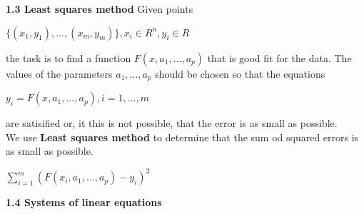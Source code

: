 \documentclass{article}
\begin{document}
\begin{multicols}{2}
	\textbf{1.3 Least squares method}
	Given points
	\begin{center}
		\begin{math}
			\{ (x_1, y_1), \dots, (x_m, y_m) \}, x_i \in R^n , y_i \in R
		\end{math}
	\end{center}
	the task is to find a function $F(x, a_1, \dots, a_p)$ that is good fit for the data.
	The values of the parameters $a_1, \dots, a_p$ should be chosen so that the equations
	\begin{center}
		\begin{math}
			y_i = F(x, a_1, \dots, a_p), i=1,\dots,m
		\end{math}
	\end{center} are satisified or, it this is not possible, that the error is as small as possible.\\
	We use \textbf{Least squares method} to determine that the sum od squared errors is as small as possible.
	\begin{center}
		\begin{math}
			\sum_{i=1}^m (F(x_i, a_1, \dots, a_p) - y_i)^2
		\end{math}
	\end{center}

	\textbf{1.4 Systems of linear equations}


\end{multicols}
\end{document}
